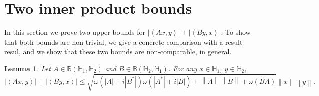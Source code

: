\documentclass[12pt,twoside,reqno]{amsart}
\newtheorem{lemma}{Lemma}[section]
\numberwithin{equation}{section}
\begin{document}
\section{Two inner product bounds}
In this section we prove two upper bounds for $\left| \left\langle Ax,y \right\rangle  \right|+\left| \left\langle By,x \right\rangle  \right|.$ To show that both bounds are non-trivial, we give a concrete comparison with a result resul, and we show that these two bounds are non-comparable, in general.
\begin{lemma}\label{2}
Let $A\in \mathbb B\left( {{\mathbb H}_{1}},{{\mathbb H}_{2}} \right)$ and $B\in \mathbb B\left( {{\mathbb H}_{2}},{{\mathbb H}_{1}} \right)$. For any $x\in {{\mathbb H}_{1}} $, $y\in {{\mathbb H}_{2}}$, 
\[\left| \left\langle Ax,y \right\rangle  \right|+\left| \left\langle By,x \right\rangle  \right|\le \sqrt{\omega \left( \left| A \right|+i\left| {{B}^{*}} \right| \right)\omega \left( \left| {{A}^{*}} \right|+i\left| B \right| \right)+\left\| A \right\|\left\| B \right\|+\omega \left( BA \right)}\left\| x \right\|\left\| y \right\|.\]
\end{lemma}
\end{document}

